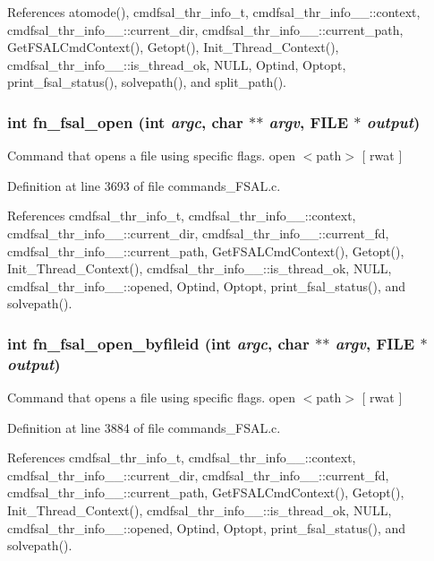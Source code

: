 References atomode(), cmdfsal\_\-thr\_\-info\_\-t, cmdfsal\_\-thr\_\-info\_\-\_\-::context, cmdfsal\_\-thr\_\-info\_\-\_\-::current\_\-dir, cmdfsal\_\-thr\_\-info\_\-\_\-::current\_\-path, Get\-FSALCmd\-Context(), Getopt(), Init\_\-Thread\_\-Context(), cmdfsal\_\-thr\_\-info\_\-\_\-::is\_\-thread\_\-ok, NULL, Optind, Optopt, print\_\-fsal\_\-status(), solvepath(), and split\_\-path().
\subsubsection{\setlength{\rightskip}{0pt plus 5cm}int fn\_\-fsal\_\-open (int {\em argc}, char $\ast$$\ast$ {\em argv}, FILE $\ast$ {\em output})}\label{commands_8h_a22}


Command that opens a file using specific flags. open $<$path$>$ [ rwat ] 

Definition at line 3693 of file commands\_\-FSAL.c.

References cmdfsal\_\-thr\_\-info\_\-t, cmdfsal\_\-thr\_\-info\_\-\_\-::context, cmdfsal\_\-thr\_\-info\_\-\_\-::current\_\-dir, cmdfsal\_\-thr\_\-info\_\-\_\-::current\_\-fd, cmdfsal\_\-thr\_\-info\_\-\_\-::current\_\-path, Get\-FSALCmd\-Context(), Getopt(), Init\_\-Thread\_\-Context(), cmdfsal\_\-thr\_\-info\_\-\_\-::is\_\-thread\_\-ok, NULL, cmdfsal\_\-thr\_\-info\_\-\_\-::opened, Optind, Optopt, print\_\-fsal\_\-status(), and solvepath().
\subsubsection{\setlength{\rightskip}{0pt plus 5cm}int fn\_\-fsal\_\-open\_\-byfileid (int {\em argc}, char $\ast$$\ast$ {\em argv}, FILE $\ast$ {\em output})}\label{commands_8h_a24}


Command that opens a file using specific flags. open $<$path$>$ [ rwat ] 

Definition at line 3884 of file commands\_\-FSAL.c.

References cmdfsal\_\-thr\_\-info\_\-t, cmdfsal\_\-thr\_\-info\_\-\_\-::context, cmdfsal\_\-thr\_\-info\_\-\_\-::current\_\-dir, cmdfsal\_\-thr\_\-info\_\-\_\-::current\_\-fd, cmdfsal\_\-thr\_\-info\_\-\_\-::current\_\-path, Get\-FSALCmd\-Context(), Getopt(), Init\_\-Thread\_\-Context(), cmdfsal\_\-thr\_\-info\_\-\_\-::is\_\-thread\_\-ok, NULL, cmdfsal\_\-thr\_\-info\_\-\_\-::opened, Optind, Optopt, print\_\-fsal\_\-status(), and solvepath().
